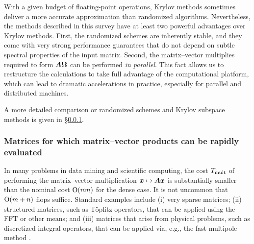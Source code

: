 \documentclass{article}
\begin{document}
With a given budget of floating-point operations, Krylov methods
sometimes deliver a more accurate approximation than randomized
algorithms.  Nevertheless, the methods described in this survey have at least
two powerful advantages over Krylov methods.  First, the randomized schemes
are inherently stable, and they come with very strong performance guarantees
that do not depend on %
subtle spectral properties of the input matrix.  Second, the matrix--vector multiplies
required to form $\bm{A\Omega}$ can be performed \emph{in parallel}.  This
fact allows us to restructure the calculations to take full advantage of the
computational platform, which can lead to dramatic accelerations in practice,
especially for parallel and distributed machines.


A more detailed comparison or randomized schemes and Krylov subspace methods
is given in \S\ref{sec:fastmatvec}.

\subsubsection{Matrices for which matrix--vector products can be rapidly evaluated}
\label{sec:fastmatvec}

In many problems in data mining and scientific computing, the cost
$T_{\rm mult}$ of performing the matrix--vector multiplication
$\bm{x} \mapsto \bm{A}\bm{x}$ is substantially smaller
than the nominal cost $\mathrm{O}(mn)$ for the dense case.
It is not uncommon that $\mathrm{O}(m + n)$ flops suffice.
Standard examples include (i) very sparse matrices;
(ii) structured matrices, such as T{\"o}plitz operators, that can be applied
using the FFT or other means; and
(iii) matrices that arise from physical problems, such as
discretized integral operators, that can be applied via, e.g.,
the fast multipole method \cite{rokhlin1997}.
\end{document}
